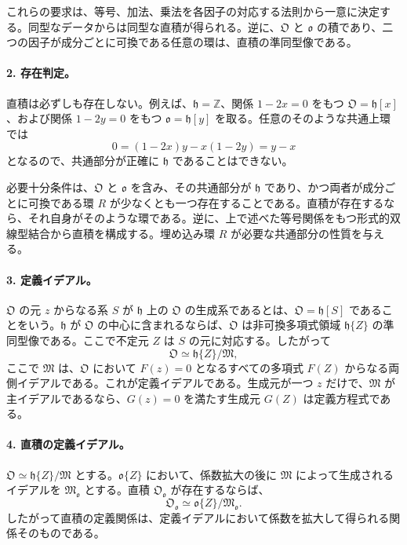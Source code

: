 \documentclass[11pt]{article}
\begin{document}
これらの要求は、等号、加法、乗法を各因子の対応する法則から一意に決定する。同型なデータからは同型な直積が得られる。逆に、\(\mathfrak O\) と \(\mathfrak o\) の積であり、二つの因子が成分ごとに可換である任意の環は、直積の準同型像である。

\paragraph{2. 存在判定。}
直積は必ずしも存在しない。例えば、\(\mathfrak h=\mathbb Z\)、関係 \(1-2x=0\) をもつ \(\mathfrak O=\mathfrak h[x]\)、および関係 \(1-2y=0\) をもつ \(\mathfrak o=\mathfrak h[y]\) を取る。任意のそのような共通上環では
\[
        0=(1-2x)y-x(1-2y)=y-x
\]
となるので、共通部分が正確に \(\mathfrak h\) であることはできない。

必要十分条件は、\(\mathfrak O\) と \(\mathfrak o\) を含み、その共通部分が \(\mathfrak h\) であり、かつ両者が成分ごとに可換である環 \(R\) が少なくとも一つ存在することである。直積が存在するなら、それ自身がそのような環である。逆に、上で述べた等号関係をもつ形式的双線型結合から直積を構成する。埋め込み環 \(R\) が必要な共通部分の性質を与える。

\paragraph{3. 定義イデアル。}
\(\mathfrak O\) の元 \(z\) からなる系 \(S\) が \(\mathfrak h\) 上の \(\mathfrak O\) の生成系であるとは、\(\mathfrak O=\mathfrak h[S]\) であることをいう。\(\mathfrak h\) が \(\mathfrak O\) の中心に含まれるならば、\(\mathfrak O\) は非可換多項式領域 \(\mathfrak h\{Z\}\) の準同型像である。ここで不定元 \(Z\) は \(S\) の元に対応する。したがって
\[
        \mathfrak O\simeq \mathfrak h\{Z\}/\mathfrak M,
\]
ここで \(\mathfrak M\) は、\(\mathfrak O\) において \(F(z)=0\) となるすべての多項式 \(F(Z)\) からなる両側イデアルである。これが定義イデアルである。生成元が一つ \(z\) だけで、\(\mathfrak M\) が主イデアルであるなら、\(G(z)=0\) を満たす生成元 \(G(Z)\) は定義方程式である。

\paragraph{4. 直積の定義イデアル。}
\(\mathfrak O\simeq\mathfrak h\{Z\}/\mathfrak M\) とする。\(\mathfrak o\{Z\}\) において、係数拡大の後に \(\mathfrak M\) によって生成されるイデアルを \(\mathfrak M_{\mathfrak o}\) とする。直積 \(\mathfrak O_{\mathfrak o}\) が存在するならば、
\[
        \mathfrak O_{\mathfrak o}\simeq \mathfrak o\{Z\}/\mathfrak M_{\mathfrak o}.
\]
したがって直積の定義関係は、定義イデアルにおいて係数を拡大して得られる関係そのものである。
\end{document}
